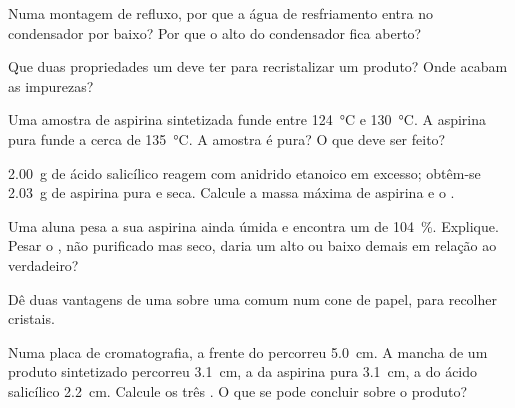 \begin{exercise}[$\star$]\label{exo:g10:synthesis-yield:3}
Numa montagem de refluxo, por que a água de resfriamento entra no
condensador por baixo? Por que o alto do condensador fica aberto?
\end{exercise}

\begin{exercise}[$\star$]\label{exo:g10:synthesis-yield:4}
Que duas propriedades um  deve ter para recristalizar um
produto? Onde acabam as impurezas?
\end{exercise}

\begin{exercise}[$\star$]\label{exo:g10:synthesis-yield:5}
Uma amostra de aspirina sintetizada funde entre \qty{124}{\celsius} e
\qty{130}{\celsius}. A aspirina pura funde a cerca de
\qty{135}{\celsius}. A amostra é pura? O que deve ser feito?
\end{exercise}

\begin{exercise}[$\star\star$]\label{exo:g10:synthesis-yield:6}
\qty{2.00}{g} de ácido salicílico reagem com anidrido etanoico em
excesso; obtêm-se \qty{2.03}{g} de aspirina pura e seca. Calcule a massa
máxima de aspirina e o .
\end{exercise}

\begin{exercise}[$\star\star$]\label{exo:g10:synthesis-yield:7}
Uma aluna pesa a sua aspirina ainda úmida e encontra um  de
\qty{104}{\percent}. Explique. Pesar o , não purificado mas
seco, daria um  alto ou baixo demais em relação ao 
verdadeiro?
\end{exercise}

\begin{exercise}[$\star\star$]\label{exo:g10:synthesis-yield:8}
Dê duas vantagens de uma  sobre uma  comum
num cone de papel, para recolher cristais.
\end{exercise}

\begin{exercise}[$\star\star$]\label{exo:g10:synthesis-yield:9}
Numa placa de cromatografia, a frente do  percorreu
\qty{5.0}{cm}. A mancha de um produto sintetizado percorreu
\qty{3.1}{cm}, a da aspirina pura \qty{3.1}{cm}, a do ácido salicílico
\qty{2.2}{cm}. Calcule os três . O que se pode
concluir sobre o produto?
\end{exercise}

